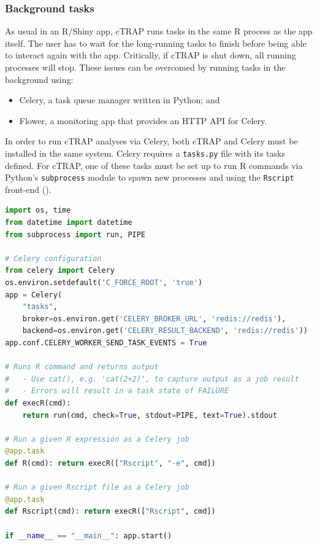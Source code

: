 \subsubsection{Background tasks}

As usual in an R/Shiny app, cTRAP runs tasks in the same R process as the app itself. The user has to wait for the long-running tasks to finish before being able to interact again with the app. Critically, if cTRAP is shut down, all running processes will stop. These issues can be overcomed by running tasks in the background using:

\begin{itemize}
	\item Celery, a task queue manager written in Python; and
	\item Flower, a monitoring app that provides an HTTP API for Celery.
\end{itemize}

In order to run cTRAP analyses via Celery, both cTRAP and Celery must be installed in the same system. Celery requires a \texttt{tasks.py} file with its tasks defined. For cTRAP, one of these tasks must be set up to run R commands via Python's \texttt{subprocess} module to spawn new processes and using the \texttt{Rscript} front-end ().

\begin{lstlisting}[language=python,caption=An example \texttt{tasks.py} file to run R commands or Rscript files via Celery.,label={lst:tasks.py},morekeywords={import},keywordstyle=\bfseries]
import os, time
from datetime import datetime
from subprocess import run, PIPE

# Celery configuration
from celery import Celery
os.environ.setdefault('C_FORCE_ROOT', 'true')
app = Celery(
    "tasks",
    broker=os.environ.get('CELERY_BROKER_URL', 'redis://redis'),
    backend=os.environ.get('CELERY_RESULT_BACKEND', 'redis://redis'))
app.conf.CELERY_WORKER_SEND_TASK_EVENTS = True

# Runs R command and returns output
#   - Use cat(), e.g. 'cat(2+2)', to capture output as a job result
#   - Errors will result in a task state of FAILURE
def execR(cmd):
    return run(cmd, check=True, stdout=PIPE, text=True).stdout

# Run a given R expression as a Celery job
@app.task
def R(cmd): return execR(["Rscript", "-e", cmd])

# Run a given Rscript file as a Celery job
@app.task
def Rscript(cmd): return execR(["Rscript", cmd])

if __name__ == "__main__": app.start()
\end{lstlisting}

